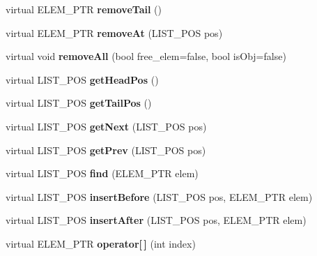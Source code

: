 \begin{DoxyCompactItemize}
\item 
\hypertarget{class_c_list_adc7cb308e77a9e0550eecce9333b071b}{virtual E\-L\-E\-M\-\_\-\-P\-T\-R {\bfseries remove\-Tail} ()}\label{class_c_list_adc7cb308e77a9e0550eecce9333b071b}

\item 
\hypertarget{class_c_list_a4baf624e719e27016de00005bbbc0f7b}{virtual E\-L\-E\-M\-\_\-\-P\-T\-R {\bfseries remove\-At} (L\-I\-S\-T\-\_\-\-P\-O\-S pos)}\label{class_c_list_a4baf624e719e27016de00005bbbc0f7b}

\item 
\hypertarget{class_c_list_a5ee3e7395c54395c7f603c08a1b9d5cf}{virtual void {\bfseries remove\-All} (bool free\-\_\-elem=false, bool is\-Obj=false)}\label{class_c_list_a5ee3e7395c54395c7f603c08a1b9d5cf}

\item 
\hypertarget{class_c_list_a9d1f8b32387ace522e2fa3a5bf68975a}{virtual L\-I\-S\-T\-\_\-\-P\-O\-S {\bfseries get\-Head\-Pos} ()}\label{class_c_list_a9d1f8b32387ace522e2fa3a5bf68975a}

\item 
\hypertarget{class_c_list_a8cfadd6c7dd3dd6688e314b732e7b48f}{virtual L\-I\-S\-T\-\_\-\-P\-O\-S {\bfseries get\-Tail\-Pos} ()}\label{class_c_list_a8cfadd6c7dd3dd6688e314b732e7b48f}

\item 
\hypertarget{class_c_list_a30c0314e7dc83d1ba735f673b09e4deb}{virtual L\-I\-S\-T\-\_\-\-P\-O\-S {\bfseries get\-Next} (L\-I\-S\-T\-\_\-\-P\-O\-S pos)}\label{class_c_list_a30c0314e7dc83d1ba735f673b09e4deb}

\item 
\hypertarget{class_c_list_a4cf8035d25af022ba9c054c1b4f5b61c}{virtual L\-I\-S\-T\-\_\-\-P\-O\-S {\bfseries get\-Prev} (L\-I\-S\-T\-\_\-\-P\-O\-S pos)}\label{class_c_list_a4cf8035d25af022ba9c054c1b4f5b61c}

\item 
\hypertarget{class_c_list_ac10ff6ad96cb1a7aebb866d2a1cf62bf}{virtual L\-I\-S\-T\-\_\-\-P\-O\-S {\bfseries find} (E\-L\-E\-M\-\_\-\-P\-T\-R elem)}\label{class_c_list_ac10ff6ad96cb1a7aebb866d2a1cf62bf}

\item 
\hypertarget{class_c_list_a02ae0a29f9466904e349a984d287a756}{virtual L\-I\-S\-T\-\_\-\-P\-O\-S {\bfseries insert\-Before} (L\-I\-S\-T\-\_\-\-P\-O\-S pos, E\-L\-E\-M\-\_\-\-P\-T\-R elem)}\label{class_c_list_a02ae0a29f9466904e349a984d287a756}

\item 
\hypertarget{class_c_list_ac30a5a1368438fbcf58b13bf4f2f44ad}{virtual L\-I\-S\-T\-\_\-\-P\-O\-S {\bfseries insert\-After} (L\-I\-S\-T\-\_\-\-P\-O\-S pos, E\-L\-E\-M\-\_\-\-P\-T\-R elem)}\label{class_c_list_ac30a5a1368438fbcf58b13bf4f2f44ad}

\item 
\hypertarget{class_c_list_aab328a02021b5988496f2dbb631bd71c}{virtual E\-L\-E\-M\-\_\-\-P\-T\-R {\bfseries operator\mbox{[}$\,$\mbox{]}} (int index)}\label{class_c_list_aab328a02021b5988496f2dbb631bd71c}

\end{DoxyCompactItemize}
